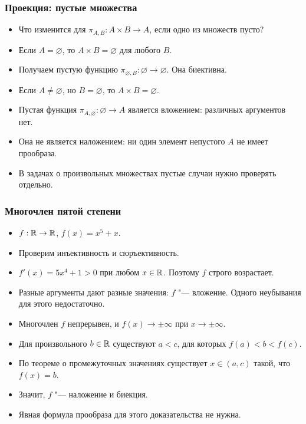 \documentclass[10pt]{beamer}
\begin{document}
\begin{frame}
    \frametitle{Проекция: пустые множества}
    \begin{itemize}
        \item Что изменится для $\pi_{A,B}:A\times B\to A$, если одно из множеств пусто?
        \item<2-> Если $A=\varnothing$, то $A\times B=\varnothing$ для любого $B$.
        \item<3-> Получаем пустую функцию $\pi_{\varnothing,B}:\varnothing\to\varnothing$. Она биективна.
        \item<4-> Если $A\neq\varnothing$, но $B=\varnothing$, то $A\times B=\varnothing$.
        \item<5-> Пустая функция $\pi_{A,\varnothing}:\varnothing\to A$ является вложением: различных аргументов нет.
        \item<6-> Она не является наложением: ни один элемент непустого $A$ не имеет прообраза.
        \item<7-> В задачах о произвольных множествах пустые случаи нужно проверять отдельно.
    \end{itemize}
\end{frame}

\begin{frame}
    \frametitle{Многочлен пятой степени}
    \begin{itemize}
        \item $f:\mathbb{R}\to\mathbb{R}$, $f(x)=x^5+x$.
        \item Проверим инъективность и сюръективность.
        \item<2-> $f'(x)=5x^4+1>0$ при любом $x\in\mathbb{R}$. Поэтому $f$ строго возрастает.
        \item<3-> Разные аргументы дают разные значения: $f$ "--- вложение. Одного неубывания для этого недостаточно.
        \item<4-> Многочлен $f$ непрерывен, и $f(x)\to\pm\infty$ при $x\to\pm\infty$.
        \item<5-> Для произвольного $b\in\mathbb{R}$ существуют $a<c$, для которых $f(a)<b<f(c)$.
        \item<6-> По теореме о промежуточных значениях существует $x\in(a,c)$ такой, что $f(x)=b$.
        \item<7-> Значит, $f$ "--- наложение и биекция.
        \item<7-> Явная формула прообраза для этого доказательства не нужна.
    \end{itemize}
\end{frame}
\end{document}
